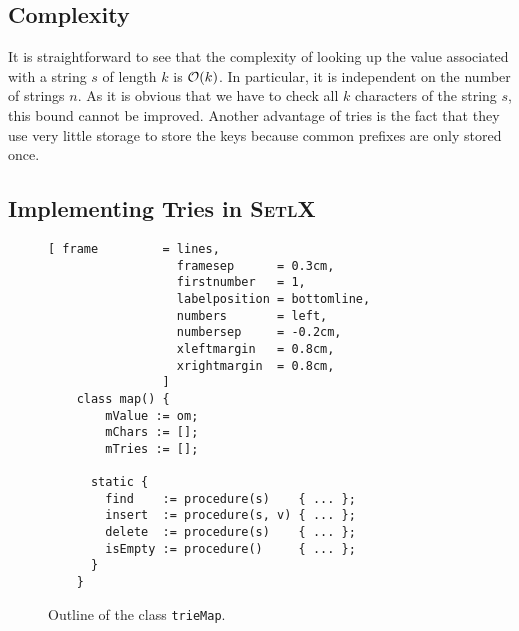 \subsection{Complexity}
It is straightforward to see that the complexity of looking up the value associated with a string
$s$ of length $k$ is $\mathcal{O}(k)$.  In particular, it is independent on the number of strings $n$.  As
it is obvious that we have to check all $k$ characters of the string $s$, this bound cannot be
improved.   Another advantage of tries is the fact that they use very little storage to store the
keys because common prefixes are only stored once. 

\subsection{Implementing Tries in \textsc{SetlX}}
\begin{figure}[!ht]
\centering
\begin{Verbatim}[ frame         = lines, 
                  framesep      = 0.3cm, 
                  firstnumber   = 1,
                  labelposition = bottomline,
                  numbers       = left,
                  numbersep     = -0.2cm,
                  xleftmargin   = 0.8cm,
                  xrightmargin  = 0.8cm,
                ]
    class map() {
        mValue := om;
        mChars := [];
        mTries := [];
    
      static {
        find    := procedure(s)    { ... };
        insert  := procedure(s, v) { ... };
        delete  := procedure(s)    { ... };
        isEmpty := procedure()     { ... };
      }
    }
\end{Verbatim}
\vspace*{-0.3cm}
\caption{Outline of the class \texttt{trieMap}.}
\label{fig:trie.stlx-outline}
\end{figure}


